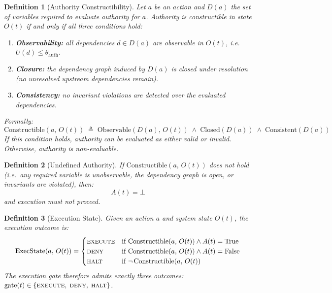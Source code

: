 \documentclass[11pt]{article}
\newtheorem{definition}{Definition}
\begin{document}
\begin{definition}[Authority Constructibility]
\label{def:constructible}
Let $a$ be an action and $D(a)$ the set of variables required to evaluate authority
for $a$. Authority is \emph{constructible} in state $O(t)$ if and only if all three
conditions hold:
\begin{enumerate}
  \item \textbf{Observability:} all dependencies $d \in D(a)$ are observable in $O(t)$,
        i.e.\ $U(d) \leq \theta_{\mathrm{auth}}$.
  \item \textbf{Closure:} the dependency graph induced by $D(a)$ is closed under
        resolution (no unresolved upstream dependencies remain).
  \item \textbf{Consistency:} no invariant violations are detected over the evaluated
        dependencies.
\end{enumerate}
Formally:
\[
  \mathrm{Constructible}(a,\,O(t)) \;\triangleq\;
  \mathrm{Observable}(D(a),\,O(t)) \;\land\;
  \mathrm{Closed}(D(a)) \;\land\;
  \mathrm{Consistent}(D(a))
\]
If this condition holds, authority can be evaluated as either valid or invalid.
Otherwise, authority is \emph{non-evaluable}.
\end{definition}

\begin{definition}[Undefined Authority]
If $\mathrm{Constructible}(a,\,O(t))$ does not hold (i.e.\ any required variable is
unobservable, the dependency graph is open, or invariants are violated), then:
\[
  A(t) = \bot
\]
and execution must not proceed.
\end{definition}

\begin{definition}[Execution State]
\label{def:execstate}
Given an action $a$ and system state $O(t)$, the execution outcome is:
\[
  \mathrm{ExecState}(a,\,O(t)) =
  \begin{cases}
    \textsc{execute} & \text{if } \mathrm{Constructible}(a,\,O(t)) \land A(t) = \mathrm{True} \\
    \textsc{deny}    & \text{if } \mathrm{Constructible}(a,\,O(t)) \land A(t) = \mathrm{False} \\
    \textsc{halt}    & \text{if } \lnot\,\mathrm{Constructible}(a,\,O(t))
  \end{cases}
\]
The execution gate therefore admits exactly three outcomes:
$\mathrm{gate}(t) \in \{\textsc{execute},\; \textsc{deny},\; \textsc{halt}\}$.
\end{definition}
\end{document}
